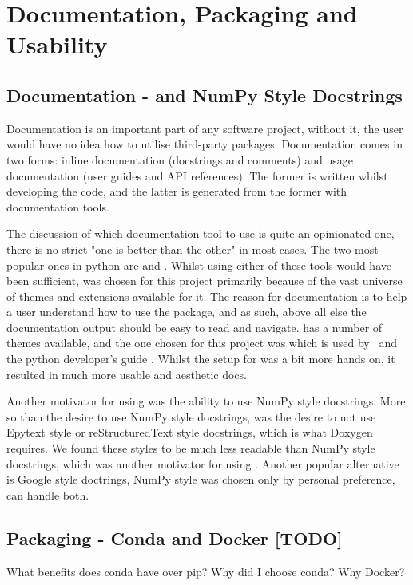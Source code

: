 
\section{Documentation, Packaging and Usability}\label{sec:documentation-packaging-and-usability}
    \subsection{Documentation -  and NumPy Style Docstrings}\label{subsec:documentation-sphinx}
    Documentation is an important part of any software project, without it, the user would have no idea how to utilise
    third-party packages.
    Documentation comes in two forms: inline documentation (docstrings and comments) and usage documentation (user guides
    and API references).
    The former is written whilst developing the code, and the latter is generated from the former with documentation tools.

    The discussion of which documentation tool to use is quite an opinionated one, there is no strict "one is better than
    the other" in most cases.
    The two most popular ones in python are  and .
    Whilst using either of these tools would have been sufficient,  was chosen for this project
    primarily because of the vast universe of themes and extensions available for it.
    The reason for documentation is to help a user understand how to use the package, and as such, above all else
    the documentation output should be easy to read and navigate.
     has a number of themes available, and the one chosen for this project was  which
    is used by  \cite{pip-docs}\,  \cite{black-docs} and the python developer's guide
    \cite{python-devguide}.
    Whilst the setup for  was a bit more hands on, it resulted in much more usable and aesthetic docs.

    Another motivator for using  was the ability to use NumPy style docstrings.
    More so than the desire to use NumPy style docstrings, was the desire to not use Epytext style or reStructuredText style
    docstrings, which is what Doxygen requires.
    We found these styles to be much less readable than NumPy style docstrings, which was another motivator for using
    .
    Another popular alternative is Google style doctrings, NumPy style was chosen only by personal preference, 
    can handle both.

    \subsection{Packaging - Conda and Docker [TODO]}\label{subsec:packaging-pypi}
    What benefits does conda have over pip? Why did I choose conda?
    Why Docker?
